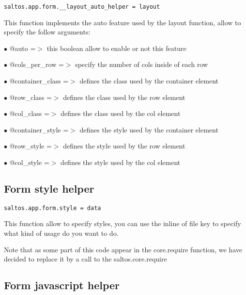 \documentclass[a4paper]{book}
\begin{document}
\begin{lstlisting}
saltos.app.form.__layout_auto_helper = layout
\end{lstlisting}

This function implements the auto feature used by the layout function, allow to specify the
follow arguments:

\begin{compactitem}
\item[\color{myblue}$\bullet$] @auto            =$>$ this boolean allow to enable or not this feature
\item[\color{myblue}$\bullet$] @cols\_per\_row    =$>$ specify the number of cols inside of each row
\item[\color{myblue}$\bullet$] @container\_class =$>$ defines the class used by the container element
\item[\color{myblue}$\bullet$] @row\_class       =$>$ defines the class used by the row element
\item[\color{myblue}$\bullet$] @col\_class       =$>$ defines the class used by the col element
\item[\color{myblue}$\bullet$] @container\_style =$>$ defines the style used by the container element
\item[\color{myblue}$\bullet$] @row\_style       =$>$ defines the style used by the row element
\item[\color{myblue}$\bullet$] @col\_style       =$>$ defines the style used by the col element
\end{compactitem}

\hypertarget{toc382}{}
\subsection{Form style helper}

\begin{lstlisting}
saltos.app.form.style = data
\end{lstlisting}

This function allow to specify styles, you can use the inline of file key to specify
what kind of usage do you want to do.

Note that as some part of this code appear in the core.require function, we have decided
to replace it by a call to the saltos.core.require

\hypertarget{toc383}{}
\subsection{Form javascript helper}
\end{document}
